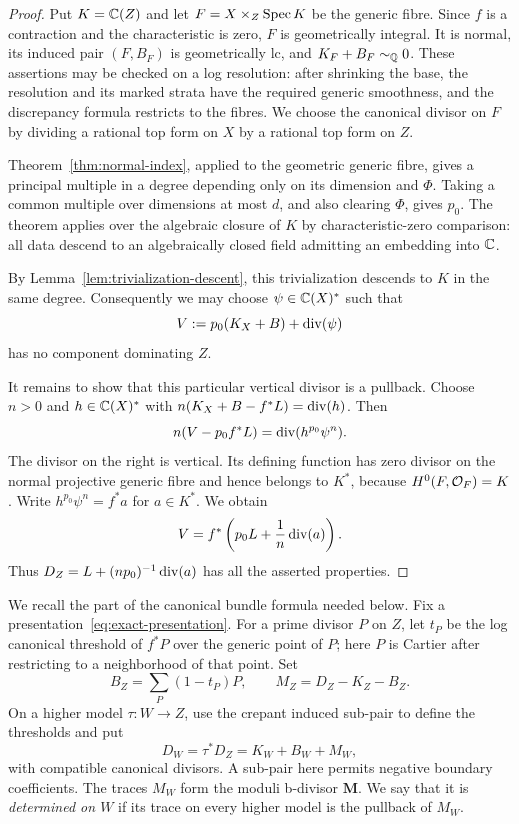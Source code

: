 \begin{proof}
Put $K=\mathbb C(Z)$ and let $F=X\times_Z\operatorname{Spec} K$ be the generic fibre.
Since $f$ is a contraction and the characteristic is zero, $F$ is
geometrically integral.  It is normal, its induced pair $(F,B_F)$ is
geometrically lc, and $K_F+B_F\sim_{\mathbb Q}0$.  These assertions may be checked
on a log resolution: after shrinking the base, the resolution and its
marked strata have the required generic smoothness, and the discrepancy
formula restricts to the fibres.  We choose the canonical divisor on $F$
by dividing a rational top form on $X$ by a rational top form on $Z$.

Theorem~\ref{thm:normal-index}, applied to the geometric generic fibre,
gives a principal multiple in a degree depending only on its dimension
and $\Phi$.  Taking a common multiple over dimensions at most $d$, and
also clearing $\Phi$, gives $p_0$.  The theorem applies over the algebraic
closure of $K$ by characteristic-zero comparison: all data descend to an
algebraically closed field admitting an embedding into $\mathbb C$.

By Lemma~\ref{lem:trivialization-descent}, this trivialization descends
to $K$ in the same degree.  Consequently we may choose
$\psi\in\mathbb C(X)^*$ such that
\[
 V:=p_0(K_X+B)+\operatorname{div}(\psi)
\]
has no component dominating $Z$.

It remains to show that this particular vertical divisor is a pullback.
Choose $n>0$ and $h\in\mathbb C(X)^*$ with
$n(K_X+B-f^*L)=\operatorname{div}(h)$.  Then
\[
 n(V-p_0f^*L)=\operatorname{div}(h^{p_0}\psi^n).
\]
The divisor on the right is vertical.  Its defining function has zero
divisor on the normal projective generic fibre and hence belongs to
$K^*$, because $H^0(F,\mathcal O_F)=K$.  Write
$h^{p_0}\psi^n=f^*a$ for $a\in K^*$.  We obtain
\[
 V=f^*\left(p_0L+\frac1n\operatorname{div}(a)\right).
\]
Thus $D_Z=L+(np_0)^{-1}\operatorname{div}(a)$ has all the asserted properties.
\end{proof}

We recall the part of the canonical bundle formula needed below.  Fix a
presentation~\eqref{eq:exact-presentation}.  For a prime divisor $P$ on
$Z$, let $t_P$ be the log canonical threshold of $f^*P$ over the generic
point of $P$; here $P$ is Cartier after restricting to a neighborhood of
that point.  Set
\begin{equation}\label{eq:cbf-definition}
 B_Z=\sum_P(1-t_P)P,\qquad M_Z=D_Z-K_Z-B_Z.
\end{equation}
On a higher model $\tau:W\to Z$, use the crepant induced sub-pair to
define the thresholds and put
\begin{equation}\label{eq:cbf-higher}
 D_W=\tau^*D_Z=K_W+B_W+M_W,
\end{equation}
with compatible canonical divisors.  A sub-pair here permits negative
boundary coefficients.  The traces $M_W$ form the moduli b-divisor
$\mathbf M$.  We say that it is \emph{determined on $W$} if its trace on
every higher model is the pullback of $M_W$.

